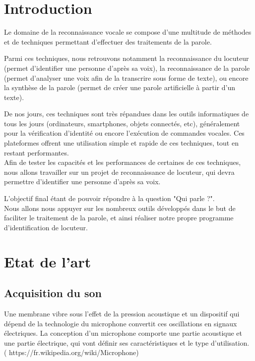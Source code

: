 \documentclass[a4paper, 12pt]{book}
\newcounter{program}[subsection]
\begin{document}
\chapter*{Introduction}

Le domaine de la reconnaissance vocale se compose d'une multitude de méthodes et de techniques permettant d'effectuer des traitements de la parole. 

Parmi ces techniques, nous retrouvons notamment la reconnaissance du locuteur (permet d'identifier une personne d'après sa voix), la reconnaissance de la parole (permet d'analyser une voix afin de la transcrire sous forme de texte), ou encore la synthèse de la parole (permet de créer une parole artificielle à partir d'un texte).

De nos jours, ces techniques sont très répandues dans les outils informatiques de tous les jours (ordinateurs, smartphones, objets connectés, etc), généralement pour la vérification d'identité ou encore l'exécution de commandes vocales. Ces plateformes offrent une utilisation simple et rapide de ces techniques, tout en restant performantes.\\

Afin de tester les capacités et les performances de certaines de ces techniques, nous allons travailler sur un projet de reconnaissance de locuteur, qui devra permettre d'identifier une personne d'après sa voix.

L'objectif final étant de pouvoir répondre à la question "Qui parle ?".\\

Nous allons nous appuyer sur les nombreux outils développés dans le but de faciliter le traitement de la parole, et ainsi réaliser notre propre programme d'identification de locuteur.


\chapter{Etat de l'art}

\section{Acquisition du son}

Une membrane vibre sous l'effet de la pression acoustique et un dispositif qui dépend de la technologie du microphone convertit ces oscillations en signaux électriques. La conception d'un microphone comporte une partie acoustique et une partie électrique, qui vont définir ses caractéristiques et le type d'utilisation. ( https://fr.wikipedia.org/wiki/Microphone)
\end{document}

